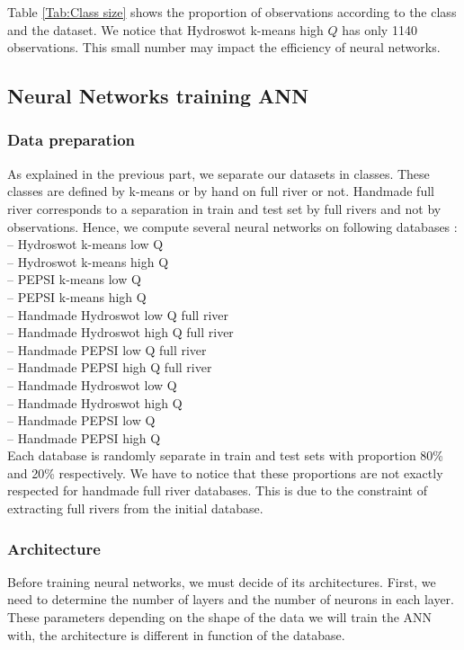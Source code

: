 Table \ref{Tab:Class size} shows the proportion of observations according to the class and the dataset. We notice that Hydroswot k-means high $Q$ has only 1140 observations. This small number may impact the efficiency of neural networks. 

\subsection{Neural Networks training ANN}

\subsubsection{Data preparation}

As explained in the previous part, we separate our datasets in classes. These classes are defined by k-means or by hand on full river or not. Handmade full river corresponds to a separation in train and test set by full rivers and not by observations. Hence, we compute several neural networks on following databases : \\
-- Hydroswot k-means low Q \\
-- Hydroswot k-means high Q \\
-- PEPSI k-means low Q \\
-- PEPSI k-means high Q \\
-- Handmade Hydroswot low Q full river \\
-- Handmade Hydroswot high Q full river\\
-- Handmade PEPSI low Q full river \\
-- Handmade PEPSI high Q full river \\
-- Handmade Hydroswot low Q  \\
-- Handmade Hydroswot high Q\\
-- Handmade PEPSI low Q  \\
-- Handmade PEPSI high Q \\

Each database is randomly separate in train and test sets with proportion 80\% and 20\% respectively. We have to notice that these proportions are not exactly respected for handmade full river databases. This is due to the constraint of extracting full rivers from the initial database. 

\subsubsection{Architecture}

Before training neural networks, we must decide of its architectures. First, we need to determine the number of layers and the number of neurons in each layer. These parameters depending on the shape of the data we will train the ANN with, the architecture is different in function of the database. 

